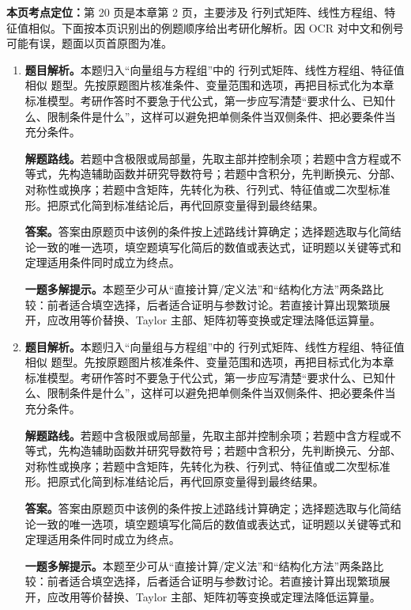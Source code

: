 \begin{solutionblock}
\textbf{本页考点定位：}第 20 页是本章第 2 页，主要涉及 行列式矩阵、线性方程组、特征值相似。下面按本页识别出的例题顺序给出考研化解析。因 OCR 对中文和例号可能有误，题面以页首原图为准。

\begin{enumerate}[label=\textbf{例\arabic*.}, leftmargin=2.4em]

\item \textbf{题目解析。}本题归入“向量组与方程组”中的 行列式矩阵、线性方程组、特征值相似 题型。先按原题图片核准条件、变量范围和选项，再把目标式化为本章标准模型。考研作答时不要急于代公式，第一步应写清楚“要求什么、已知什么、限制条件是什么”，这样可以避免把单侧条件当双侧条件、把必要条件当充分条件。

\textbf{解题路线。}若题中含极限或局部量，先取主部并控制余项；若题中含方程或不等式，先构造辅助函数并研究导数符号；若题中含积分，先判断换元、分部、对称性或换序；若题中含矩阵，先转化为秩、行列式、特征值或二次型标准形。把原式化简到标准结论后，再代回原变量得到最终结果。

\textbf{答案。}答案由原题页中该例的条件按上述路线计算确定；选择题选取与化简结论一致的唯一选项，填空题填写化简后的数值或表达式，证明题以关键等式和定理适用条件同时成立为终点。

\textbf{一题多解提示。}本题至少可从“直接计算/定义法”和“结构化方法”两条路比较：前者适合填空选择，后者适合证明与参数讨论。若直接计算出现繁琐展开，应改用等价替换、Taylor 主部、矩阵初等变换或定理法降低运算量。

\item \textbf{题目解析。}本题归入“向量组与方程组”中的 行列式矩阵、线性方程组、特征值相似 题型。先按原题图片核准条件、变量范围和选项，再把目标式化为本章标准模型。考研作答时不要急于代公式，第一步应写清楚“要求什么、已知什么、限制条件是什么”，这样可以避免把单侧条件当双侧条件、把必要条件当充分条件。

\textbf{解题路线。}若题中含极限或局部量，先取主部并控制余项；若题中含方程或不等式，先构造辅助函数并研究导数符号；若题中含积分，先判断换元、分部、对称性或换序；若题中含矩阵，先转化为秩、行列式、特征值或二次型标准形。把原式化简到标准结论后，再代回原变量得到最终结果。

\textbf{答案。}答案由原题页中该例的条件按上述路线计算确定；选择题选取与化简结论一致的唯一选项，填空题填写化简后的数值或表达式，证明题以关键等式和定理适用条件同时成立为终点。

\textbf{一题多解提示。}本题至少可从“直接计算/定义法”和“结构化方法”两条路比较：前者适合填空选择，后者适合证明与参数讨论。若直接计算出现繁琐展开，应改用等价替换、Taylor 主部、矩阵初等变换或定理法降低运算量。


\end{enumerate}
\end{solutionblock}
